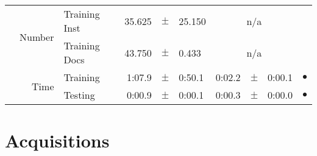 \begin{longtable}{|r|r|l||rcl|rcl|c|}
\cline{2-10} & \multirow{2}{*}{    Number} &   Training Inst &      35.625 &  $\pm$  &      25.150 &    \multicolumn{3}{c|}{n/a}         &  \\
\cline{3-10} &                             &   Training Docs &      43.750 &  $\pm$  &       0.433 &    \multicolumn{3}{c|}{n/a}         &  \\
\cline{2-10} & \multirow{2}{*}{      Time} &        Training &      1:07.9 &  $\pm$  &      0:50.1 &      0:02.2 &  $\pm$  &      0:00.1 & $\bullet$ \\
\cline{3-10} &                             &         Testing &      0:00.9 &  $\pm$  &      0:00.1 &      0:00.3 &  $\pm$  &      0:00.0 & $\bullet$ \\
\hline
\end{longtable}

\clearpage

\section{Acquisitions}


